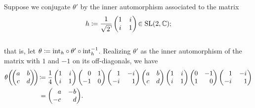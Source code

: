 \begin{example}
\noindent Suppose we conjugate $\theta'$ by the inner automorphism associated to the matrix\\[-0.9\linespacing]
\begin{align*}
\begin{split}
h \coloneqq \frac{1}{\csqrt{2}}\begin{pmatrix}1&i\\i&1\end{pmatrix}\! \in \textup{SL}(2, \mathbb{C});
\end{split}
\end{align*}
\noindent\\[-0.5\linespacing] that is, let $\theta \coloneqq \textup{int}_h\circ\theta'\circ\textup{int}_h^{-1}$. Realizing $\theta'$ as the inner automorphism of the matrix with $1$ and $-1$ on its off-diagonals, we have
\begin{align*}
\begin{split}
\theta\!\left(\!\begin{pmatrix}a&b\\c&d\end{pmatrix}\!\right)\! &\coloneqq \frac{1}{4}\begin{pmatrix}1&i\\i&1\end{pmatrix}\begin{pmatrix}\hphantom{-}0&1\\-1&0\end{pmatrix}\begin{pmatrix}\hphantom{-}1&-i\\-i&\hphantom{-}1\end{pmatrix}\begin{pmatrix}a&b\\c&d\end{pmatrix}\begin{pmatrix}1&i\\i&1\end{pmatrix}\begin{pmatrix}0&-1\\1&\hphantom{-}0\end{pmatrix}\begin{pmatrix}\hphantom{-}1&-i\\-i&\hphantom{-}1\end{pmatrix}\\
&\hphantom{\coloneqq}\nhphantom{=}= \begin{pmatrix}\hphantom{-}a&-b\\-c&\hphantom{-}d\end{pmatrix}\!.

\end{split}
\end{align*}
\end{example}
